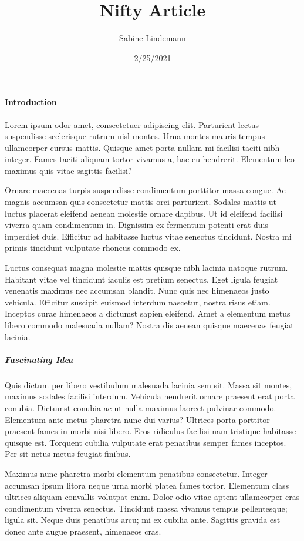 \documentclass{article}
\title{Nifty Article}
\author{Sabine Lindemann}
\date{2/25/2021}
\begin{document}
\maketitle

\paragraph{Introduction}
Lorem ipsum odor amet, consectetuer adipiscing elit. Parturient lectus suspendisse scelerisque rutrum nisl montes. Urna montes mauris tempus ullamcorper cursus mattis. Quisque amet porta nullam mi facilisi taciti nibh integer. Fames taciti aliquam tortor vivamus a, hac eu hendrerit. Elementum leo maximus quis vitae sagittis facilisi?

Ornare maecenas turpis suspendisse condimentum porttitor massa congue. Ac magnis accumsan quis consectetur mattis orci parturient. Sodales mattis ut luctus placerat eleifend aenean molestie ornare dapibus. Ut id eleifend facilisi viverra quam condimentum in. Dignissim ex fermentum potenti erat duis imperdiet duis. Efficitur ad habitasse luctus vitae senectus tincidunt. Nostra mi primis tincidunt vulputate rhoncus commodo ex.

Luctus consequat magna molestie mattis quisque nibh lacinia natoque rutrum. Habitant vitae vel tincidunt iaculis est pretium senectus. Eget ligula feugiat venenatis maximus nec accumsan blandit. Nunc quis nec himenaeos justo vehicula. Efficitur suscipit euismod interdum nascetur, nostra risus etiam. Inceptos curae himenaeos a dictumst sapien eleifend. Amet a elementum metus libero commodo malesuada nullam? Nostra dis aenean quisque maecenas feugiat lacinia.

\subparagraph{Fascinating Idea}
Quis dictum per libero vestibulum malesuada lacinia sem sit. Massa sit montes, maximus sodales facilisi interdum. Vehicula hendrerit ornare praesent erat porta conubia. Dictumst conubia ac ut nulla maximus laoreet pulvinar commodo. Elementum ante metus pharetra nunc dui varius? Ultrices porta porttitor praesent fames in morbi nisi libero. Eros ridiculus facilisi nam tristique habitasse quisque est. Torquent cubilia vulputate erat penatibus semper fames inceptos. Per sit netus metus feugiat finibus.

Maximus nunc pharetra morbi elementum penatibus consectetur. Integer accumsan ipsum litora neque urna morbi platea fames tortor. Elementum class ultrices aliquam convallis volutpat enim. Dolor odio vitae aptent ullamcorper cras condimentum viverra senectus. Tincidunt massa vivamus tempus pellentesque; ligula sit. Neque duis penatibus arcu; mi ex cubilia ante. Sagittis gravida est donec ante augue praesent, himenaeos cras.
\end{document}
